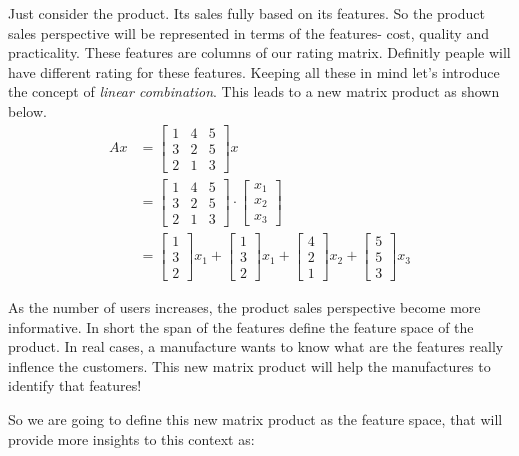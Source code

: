 \documentclass[
  letterpaper,
  DIV=11,
  numbers=noendperiod]{scrreprt}
\theoremstyle{plain}
\theoremstyle{definition}
\theoremstyle{remark}
\begin{document}
\begin{tcolorbox}
Just consider the product. Its sales fully based on its features. So the
product sales perspective will be represented in terms of the features-
cost, quality and practicality. These features are columns of our rating
matrix. Definitly peaple will have different rating for these features.
Keeping all these in mind let's introduce the concept of \emph{linear
combination}. This leads to a new matrix product as shown below.
\begin{align*}
Ax&=\begin{bmatrix}1&4&5\\3&2&5\\2&1&3\end{bmatrix}x\\
&=\begin{bmatrix}1&4&5\\3&2&5\\2&1&3\end{bmatrix}\cdot\begin{bmatrix}x_1\\x_2\\x_3\end{bmatrix}\\
&=\begin{bmatrix}1\\3\\2\end{bmatrix}x_1+\begin{bmatrix}1\\3\\2\end{bmatrix}x_1+\begin{bmatrix}4\\2\\1\end{bmatrix}x_2+\begin{bmatrix}5\\5\\3\end{bmatrix}x_3
\end{align*}

As the number of users increases, the product sales perspective become
more informative. In short the span of the features define the feature
space of the product. In real cases, a manufacture wants to know what
are the features really inflence the customers. This new matrix product
will help the manufactures to identify that features!

So we are going to define this new matrix product as the feature space,
that will provide more insights to this context as:


\end{tcolorbox}
\end{document}
